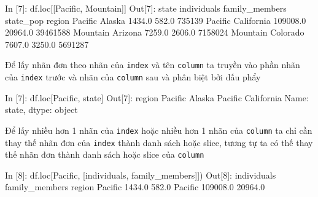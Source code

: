 \documentclass[
]{book}
\newenvironment{Shaded}{\begin{snugshade}}{\end{snugshade}}
\newcommand{\BuiltInTok}[1]{#1}
\newcommand{\DecValTok}[1]{\textcolor[rgb]{0.00,0.00,0.81}{#1}}
\newcommand{\FloatTok}[1]{\textcolor[rgb]{0.00,0.00,0.81}{#1}}
\newcommand{\NormalTok}[1]{#1}
\newcommand{\StringTok}[1]{\textcolor[rgb]{0.31,0.60,0.02}{#1}}
\begin{document}
\begin{Shaded}
\begin{Highlighting}[]
\NormalTok{In [}\DecValTok{7}\NormalTok{]: df.loc[[}\StringTok{\textquotesingle{}Pacific\textquotesingle{}}\NormalTok{, }\StringTok{\textquotesingle{}Mountain\textquotesingle{}}\NormalTok{]]}
\NormalTok{Out[}\DecValTok{7}\NormalTok{]:}
\NormalTok{               state  individuals  family\_members  state\_pop}
\NormalTok{region                                                      }
\NormalTok{Pacific       Alaska       }\FloatTok{1434.0}           \FloatTok{582.0}     \DecValTok{735139}
\NormalTok{Pacific   California     }\FloatTok{109008.0}         \FloatTok{20964.0}   \DecValTok{39461588}
\NormalTok{Mountain     Arizona       }\FloatTok{7259.0}          \FloatTok{2606.0}    \DecValTok{7158024}
\NormalTok{Mountain    Colorado       }\FloatTok{7607.0}          \FloatTok{3250.0}    \DecValTok{5691287}
\end{Highlighting}
\end{Shaded}

Để lấy nhãn đơn theo nhãn của \texttt{index} và tên \texttt{column} ta truyền vào phần nhãn của \texttt{index} trước và nhãn của \texttt{column} sau và phân biệt bởi dấu phẩy

\begin{Shaded}
\begin{Highlighting}[]
\NormalTok{In [}\DecValTok{7}\NormalTok{]: df.loc[}\StringTok{\textquotesingle{}Pacific\textquotesingle{}}\NormalTok{, }\StringTok{\textquotesingle{}state\textquotesingle{}}\NormalTok{]}
\NormalTok{Out[}\DecValTok{7}\NormalTok{]:}
\NormalTok{region}
\NormalTok{Pacific        Alaska}
\NormalTok{Pacific    California}
\NormalTok{Name: state, dtype: }\BuiltInTok{object}
\end{Highlighting}
\end{Shaded}

Để lấy nhiều hơn 1 nhãn của \texttt{index} hoặc nhiều hơn 1 nhãn của \texttt{column} ta chỉ cần thay thế nhãn đơn của \texttt{index} thành danh sách hoặc slice, tương tự ta có thế thay thế nhãn đơn thành danh sách hoặc slice của \texttt{column}

\begin{Shaded}
\begin{Highlighting}[]
\NormalTok{In [}\DecValTok{8}\NormalTok{]: df.loc[}\StringTok{\textquotesingle{}Pacific\textquotesingle{}}\NormalTok{, [}\StringTok{\textquotesingle{}individuals\textquotesingle{}}\NormalTok{, }\StringTok{\textquotesingle{}family\_members\textquotesingle{}}\NormalTok{]])}
\NormalTok{Out[}\DecValTok{8}\NormalTok{]:}
\NormalTok{         individuals  family\_members}
\NormalTok{region                              }
\NormalTok{Pacific       }\FloatTok{1434.0}           \FloatTok{582.0}
\NormalTok{Pacific     }\FloatTok{109008.0}         \FloatTok{20964.0}
\end{Highlighting}
\end{Shaded}
\end{document}
